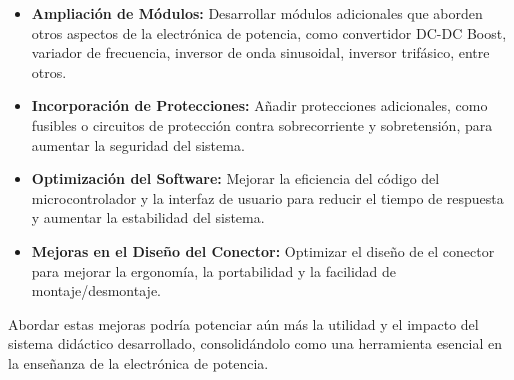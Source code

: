 \begin{itemize}[noitemsep]
    \item \textbf{Ampliación de Módulos:} Desarrollar módulos adicionales que aborden otros aspectos de la electrónica de potencia, como convertidor DC-DC Boost, variador de frecuencia, inversor de onda sinusoidal, inversor trifásico, entre otros.
    \item \textbf{Incorporación de Protecciones:} Añadir protecciones adicionales, como fusibles o circuitos de protección contra sobrecorriente y sobretensión, para aumentar la seguridad del sistema.
    \item \textbf{Optimización del Software:} Mejorar la eficiencia del código del microcontrolador y la interfaz de usuario para reducir el tiempo de respuesta y aumentar la estabilidad del sistema.
    \item \textbf{Mejoras en el Diseño del Conector:} Optimizar el diseño de el conector para mejorar la ergonomía, la portabilidad y la facilidad de montaje/desmontaje.    
\end{itemize}

Abordar estas mejoras podría potenciar aún más la utilidad y el impacto del sistema didáctico desarrollado, consolidándolo como una herramienta esencial en la enseñanza de la electrónica de potencia.
